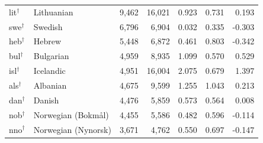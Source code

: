 \begin{tabular}{@{}l l r r r r r@{}}
lit$^{\dagger}$ & Lithuanian & 9{,}462 & 16{,}021 & 0.923 & 0.731 & 0.193 \\
swe$^{\dagger}$ & Swedish & 6{,}796 & 6{,}904 & 0.032 & 0.335 & -0.303 \\
heb$^{\dagger}$ & Hebrew & 5{,}448 & 6{,}872 & 0.461 & 0.803 & -0.342 \\
bul$^{\dagger}$ & Bulgarian & 4{,}959 & 8{,}935 & 1.099 & 0.570 & 0.529 \\
isl$^{\dagger}$ & Icelandic & 4{,}951 & 16{,}004 & 2.075 & 0.679 & 1.397 \\
als$^{\dagger}$ & Albanian & 4{,}675 & 9{,}599 & 1.255 & 1.043 & 0.213 \\
dan$^{\dagger}$ & Danish & 4{,}476 & 5{,}859 & 0.573 & 0.564 & 0.008 \\
nob$^{\dagger}$ & Norwegian (Bokm\aa l) & 4{,}455 & 5{,}586 & 0.482 & 0.596 & -0.114 \\
nno$^{\dagger}$ & Norwegian (Nynorsk) & 3{,}671 & 4{,}762 & 0.550 & 0.697 & -0.147 \\
\bottomrule
\end{tabular}